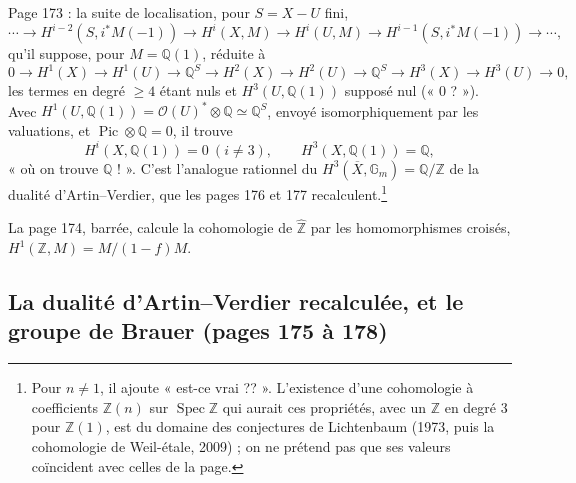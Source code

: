\documentclass[11pt,a4paper]{article}
\begin{document}
Page 173 : la suite de localisation, pour $S = X - U$ fini,
\[
  \cdots \to H^{i-2}(S, i^{*}M(-1)) \to H^{i}(X, M) \to H^{i}(U, M) \to
  H^{i-1}(S, i^{*}M(-1)) \to \cdots ,
\]
qu'il suppose, pour $M = \mathbb{Q}(1)$, réduite à
\[
  0 \to H^{1}(X) \to H^{1}(U) \to \mathbb{Q}^{S} \to H^{2}(X) \to H^{2}(U) \to
  \mathbb{Q}^{S} \to H^{3}(X) \to H^{3}(U) \to 0 ,
\]
les termes en degré $\geqslant 4$ étant nuls et $H^{3}(U, \mathbb{Q}(1))$
supposé nul (« $0$ ? »). Avec $H^{1}(U, \mathbb{Q}(1)) = \mathcal{O}(U)^{*}
\otimes \mathbb{Q} \simeq \mathbb{Q}^{S}$, envoyé isomorphiquement par les
valuations, et $\operatorname{Pic} \otimes \mathbb{Q} = 0$, il trouve
\[
  H^{i}(X, \mathbb{Q}(1)) = 0 \ (i \neq 3), \qquad H^{3}(X, \mathbb{Q}(1)) =
  \mathbb{Q} ,
\]
« où on trouve $\mathbb{Q}$ ! ».
C'est l'analogue rationnel du $H^{3}(\overline{X}, \mathbb{G}_{m}) =
\mathbb{Q}/\mathbb{Z}$ de la dualité d'Artin--Verdier, que les pages 176 et 177
recalculent.\footnote{Pour $n \neq 1$, il ajoute « est-ce vrai ?? ». L'existence
d'une cohomologie à coefficients $\mathbb{Z}(n)$ sur $\operatorname{Spec}
\mathbb{Z}$ qui aurait ces propriétés, avec un $\mathbb{Z}$ en degré $3$ pour
$\mathbb{Z}(1)$, est du domaine des conjectures de Lichtenbaum (1973, puis la
cohomologie de Weil-étale, 2009) ; on ne prétend pas que ses valeurs coïncident
avec celles de la page.}

\begin{center}
\end{center}


La page 174, barrée, calcule la cohomologie de
$\widehat{\mathbb{Z}}$ par les homomorphismes croisés, $H^{1}(\mathbb{Z}, M) =
M/(1 - f)M$.

\subsection*{La dualité d'Artin--Verdier recalculée, et le groupe de Brauer (pages 175 à 178)}
\end{document}
